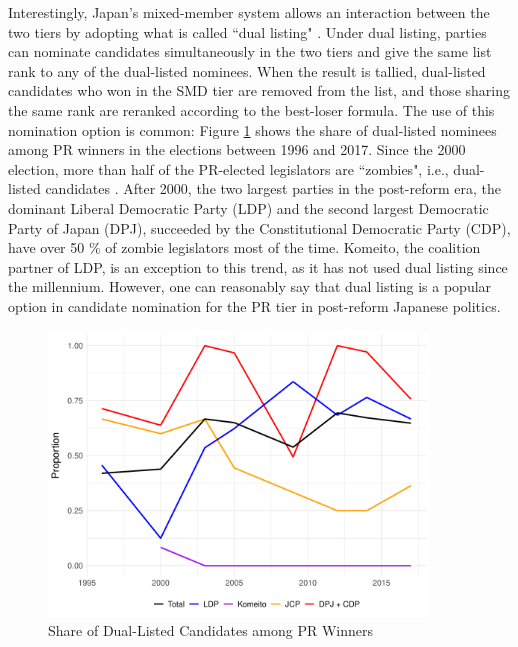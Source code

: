 \documentclass[a4paper, 11pt]{article}
\begin{document}
Interestingly, Japan's mixed-member system allows an interaction between the two tiers by adopting what is called ``dual listing" \citep{matland_determinants_2004, pekkanen2006electoral, reed2022}. Under dual listing, parties can nominate candidates simultaneously in the two tiers and give the same list rank to any of the dual-listed nominees. When the result is tallied, dual-listed candidates who won in the SMD tier are removed from the list, and those sharing the same rank are reranked according to the best-loser formula.\footnotemark{} The use of this nomination option is common: Figure \ref{fig:dual} shows the share of dual-listed nominees among PR winners in the elections between 1996 and 2017. Since the 2000 election, more than half of the PR-elected legislators are ``zombies", i.e., dual-listed candidates \citep{pekkanen2006electoral}. After 2000, the two largest parties in the post-reform era, the dominant Liberal Democratic Party (LDP) and the second largest Democratic Party of Japan (DPJ), succeeded by the Constitutional Democratic Party (CDP), have over 50 \% of zombie legislators most of the time. Komeito, the coalition partner of LDP, is an exception to this trend, as it has not used dual listing since the millennium. However, one can reasonably say that dual listing is a popular option in candidate nomination for the PR tier in post-reform Japanese politics. 


\begin{figure}[!htbp]
	\includegraphics[width = 0.9\textwidth]{../figure/paper/dual_nomination.pdf}
	\caption{Share of Dual-Listed Candidates among PR Winners}
	\label{fig:dual}
\end{figure}
\end{document}

